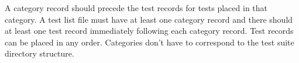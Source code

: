\documentclass{cekarticle}
\begin{document}
A category record should precede the test records for tests placed
in that category. A test list file must have at least one category
record and there should at least one test record immediately
following  each category record. Test records can be placed in any
order. Categories don't have to correspond to the test suite
directory structure.

%
%
%
\end{document}
